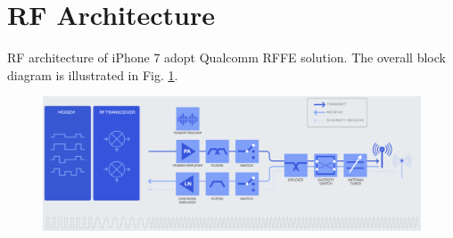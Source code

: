 \documentclass[conference]{IEEEtran}
\begin{document}
\section{RF Architecture}\label{sec:rfa}
RF architecture of iPhone 7 adopt Qualcomm RFFE solution. The overall block diagram is illustrated in Fig. \ref{fig:RF_Architecture}.

\begin{figure}[hb]
	\centering
	\begin{center}
		\includegraphics[width=0.92\linewidth]{RF_Architecture}
		\caption{} \label{fig:RF_Architecture}	
	\end{center}	
\end{figure}
\end{document}
